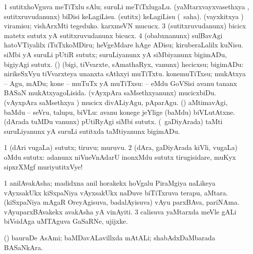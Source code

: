 {{{{{{\noindent
\gl{\pagu}
\expl{}
\bmng
\bnum
\num{1}  sutitxhoVguva meTiTxlu sAlu; suruLi meTiTxlugaLu. 
  
\banum
{} (yaMtarxvayxvasethxya \vi, sutitxruvudanunx) biDisi keLagiLisu. 
 (sutitx) keLagiLisu (\rUpa\ saha). 
 (vayxkitxya \vi) viramisu; vishArxMti tegeduko. 
 karxmeVN mucucx. 
\eanum
\numie
\num{3}  (sutitxruvudanunx) bicicx matetx sututx yA sutitxruvudanunx bicucx. 
\num{4}  (obabxnanunx) sulBavAgi hatoVTiyalilx iTuTxkoMDiru; heVgeMdare hAge ADisu; kiruberaLalilx kuNisu. 
  
\banum
{} siMbi yA suruLi pUtiR sututx; suruLiyanunx yA siMbiyanunx bigimADu, bigiyAgi sututx. 
 (\rUpa) (bigi, tiVvarxte, sAmathaRyx, \mo vanunx) hecicxsu; bigimADu:  nirikeSxVyu tiVvarxteya unanxta sAthxyi muTiTxtu. 
 konemuTiTxsu; mukAtxya -- Agu, mADu; kone -- muTuTx yA muTiTxsu:  -- eMdu GoVSisi avanu tananx BASaN mukAtxyagoLisida. 
 (vAyxpAra saMsethxyanunx) mucicxbiDu. 
 (vAyxpAra saMsethxya \vi) mucicx divALiyAgu, pAparAgu. 
 (\AmA) aMtimavAgi, baMdu -- seVru, talupu, biVLu:  avanu konege jeYlige (baMdu) biVLutAtxne. 
 (dArada tuMDu \mo vanunx) pUtiRyAgi siMbi sututx. 
 (\kanmu\ gaDiyArada) taMti suruLiyanunx yA suruLi sutitxda taMtiyanunx bigimADu. 
\eanum
\numie
\enum
\emng
\eentry

\bentry
{}
\gl{\nA}
\expl{}
\bmng
\bnum
\num{1} (dAri \mo vugaLa) sututx; tiruvu; muruvu. 
\num{2} (dAra, gaDiyArada kiVli, \mo vugaLa) oMdu sututx:  adanunx niVneVnAdarU inonxMdu sututx tirugisidare, muKyx sipxrXMgf muriyutitxVye! 
\enum
\emng
\eentry

\bentry
{}
  \gl{\nA}\bmng
\bnum
\num{1} anilAvakAsha; madidxna anil horakekx hoVgalu PiraMgiya naLikeya vAyxsakUkx kiSxpaNiya vAyxsakUkx naDuve biTiTxruva terapu, aMtara. 
\banum
{} (kiSxpaNiya mAgaR OreyAgisuva, badalAyisuva) vAyu parxBAva, pariNAma. 
 vAyuparxBAvakekx avakAsha yA vinAyiti. 
\eanum
\numie
\num{3} calisuva yaMtarxda meVle gALi biVsidAga uMTAguva GaSaRNe, ujijxke. 
\enum
\emng
\eentry

\bentry
{}
  \gl{\nA}\bmng
(\AmA) bauruDe AsAmi; baMDavALavillxda mAtALi; shabAdxDaMbarada BASaNkAra. 
\emng
\eentry

}}}}}}
